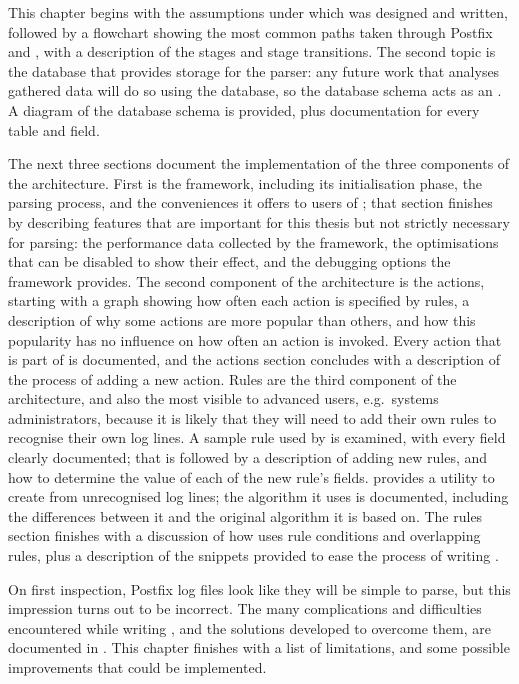 This chapter begins with the assumptions under which \parsername{} was
designed and written, followed by a flowchart showing the most common paths
taken through Postfix and \parsername{}, with a description of the stages
and stage transitions.  The second topic is the  database that
provides storage for the parser: any future work that analyses gathered
data will do so using the database, so the database schema acts as an
.  A diagram of the database schema is provided, plus
documentation for every table and field.

The next three sections document the implementation of the three components
of the architecture.  First is the framework, including its initialisation
phase, the parsing process, and the conveniences it offers to users of
\parsername{}; that section finishes by describing features that are
important for this thesis but not strictly necessary for parsing: the
performance data collected by the framework, the optimisations that can be
disabled to show their effect, and the debugging options the framework
provides.  The second component of the architecture is the actions,
starting with a graph showing how often each action is specified by rules,
a description of why some actions are more popular than others, and how
this popularity has no influence on how often an action is invoked.  Every
action that is part of \parsername{} is documented, and the actions section
concludes with a description of the process of adding a new action.  Rules
are the third component of the architecture, and also the most visible to
advanced users, e.g.\ systems administrators, because it is likely that
they will need to add their own rules to recognise their own log lines.  A
sample rule used by \parsername{} is examined, with every field clearly
documented; that is followed by a description of adding new rules, and how
to determine the value of each of the new rule's fields.  \parsername{}
provides a utility to create \regexes{} from unrecognised log lines; the
algorithm it uses is documented, including the differences between it and
the original algorithm it is based on.  The rules section finishes with a
discussion of how \parsername{} uses rule conditions and overlapping rules,
plus a description of the  snippets provided to ease the
process of writing \regexes{}.

On first inspection, Postfix log files look like they will be simple to
parse, but this impression turns out to be incorrect.  The many
complications and difficulties encountered while writing \parsername{}, and
the solutions developed to overcome them, are documented in
.  This chapter finishes with a list of
\parsernames{} limitations, and some possible improvements that could be
implemented.

